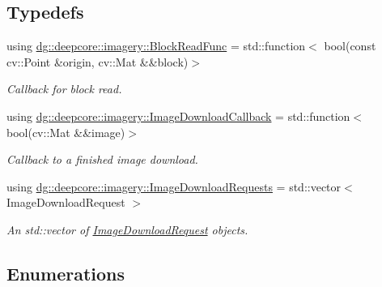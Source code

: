 \subsection*{Typedefs}
\begin{DoxyCompactItemize}
\item 
using \hyperlink{group___imagery_module_ga2238c2ef34502f68956ddef1f477ad95}{dg\+::deepcore\+::imagery\+::\+Block\+Read\+Func} = std\+::function$<$ bool(const cv\+::\+Point \&origin, cv\+::\+Mat \&\&block)$>$
\begin{DoxyCompactList}\small\item\em Callback for block read. \end{DoxyCompactList}\item 
using \hyperlink{group___imagery_module_gab8f15d39d6d4bd5bcd727b5d8b28a721}{dg\+::deepcore\+::imagery\+::\+Image\+Download\+Callback} = std\+::function$<$ bool(cv\+::\+Mat \&\&image)$>$
\begin{DoxyCompactList}\small\item\em Callback to a finished image download. \end{DoxyCompactList}\item 
using \hyperlink{group___imagery_module_ga759e24100f96d6dee1eee94f4f1d6898}{dg\+::deepcore\+::imagery\+::\+Image\+Download\+Requests} = std\+::vector$<$ Image\+Download\+Request $>$
\begin{DoxyCompactList}\small\item\em An std\+::vector of \hyperlink{structdg_1_1deepcore_1_1imagery_1_1_image_download_request}{Image\+Download\+Request} objects. \end{DoxyCompactList}\end{DoxyCompactItemize}
\subsection*{Enumerations}
